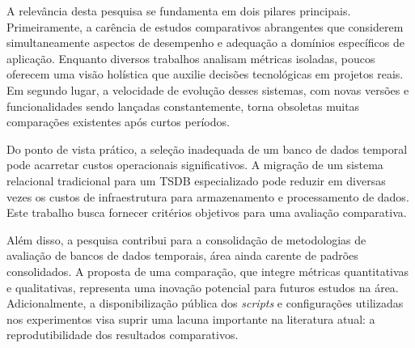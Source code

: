 A relevância desta pesquisa se fundamenta em dois pilares principais. Primeiramente, a carência de estudos comparativos abrangentes que considerem simultaneamente aspectos de desempenho e adequação a domínios específicos de aplicação. Enquanto diversos trabalhos analisam métricas isoladas, poucos oferecem uma visão holística que auxilie decisões tecnológicas em projetos reais. Em segundo lugar, a velocidade de evolução desses sistemas, com novas versões e funcionalidades sendo lançadas constantemente, torna obsoletas muitas comparações existentes após curtos períodos.

Do ponto de vista prático, a seleção inadequada de um banco de dados temporal pode acarretar custos operacionais significativos. A migração de um sistema relacional tradicional para um TSDB especializado pode reduzir em diversas vezes os custos de infraestrutura para armazenamento e processamento de dados. Este trabalho busca fornecer critérios objetivos para uma avaliação comparativa.

Além disso, a pesquisa contribui para a consolidação de metodologias de avaliação de bancos de dados temporais, área ainda carente de padrões consolidados. A proposta de uma comparação, que integre métricas quantitativas e qualitativas, representa uma inovação potencial para futuros estudos na área. Adicionalmente, a disponibilização pública dos \textit{scripts} e configurações utilizadas nos experimentos visa suprir uma lacuna importante na literatura atual: a reprodutibilidade dos resultados comparativos.